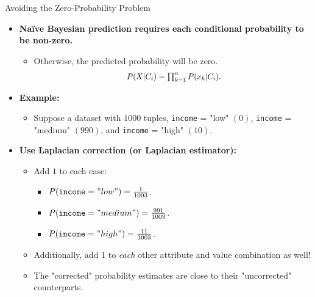 \begin{frame}{Avoiding the Zero-Probability Problem}
	\begin{itemize}
		\item \textbf{Naïve Bayesian prediction requires each conditional probability to be non-zero.}
		      \begin{itemize}
			      \item Otherwise, the predicted probability will be zero.
			            \begin{align*}
				            \resizebox{4cm}{!}{
					            $P(X|C_i) = \prod_{k=1}^{n} P(x_k|C_i).$}
			            \end{align*}
		      \end{itemize}
		\item \textbf{Example:}
		      \begin{itemize}
			      \item Suppose a dataset with $1000$ tuples, \texttt{income} = "low" $(0)$, \texttt{income} = "medium" $(990)$, and \texttt{income} = "high" $(10)$.
		      \end{itemize}
		\item \textbf{Use {\color{airforceblue}Laplacian correction} (or Laplacian estimator):}
		      \begin{itemize}
			      \item Add $1$ to each case:
			            \begin{itemize}
				            \item $P(\texttt{income} = "low") = \frac{1}{1003}$.
				            \item $P(\texttt{income} = "medium") = \frac{991}{1003}$.
				            \item $P(\texttt{income} = "high") = \frac{11}{1003}$.
			            \end{itemize}
			      \item Additionally, add 1 to \textit{each} other attribute and value combination as well!
			      \item The "corrected" probability estimates are close to their "uncorrected" counterparts.
		      \end{itemize}
	\end{itemize}
\end{frame}

